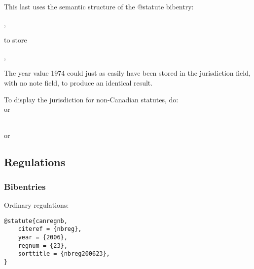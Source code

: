 \bigskip


\par\bigskip
{}\par\bigskip
{}\par\bigskip
{}\par\bigskip

This last uses the semantic structure of the @statute bibentry:\medskip

,   \medskip

to store\medskip

,  \fbox{\strut \ } \medskip

The year value 1974 could just as easily have been stored in the jurisdiction field, with no note field, to produce an identical result.\bigskip

\noindent To display the jurisdiction for non-Canadian statutes, do:\\
	{\footnotesize\textcolor{blue}{}}
	or
	{\footnotesize\textcolor{blue}{}}
   \toggletrue{statjurisdiction}

   \\
	{\footnotesize\textcolor{blue}{}}
	or
	{\footnotesize\textcolor{blue}{}}
	\togglefalse{statjurisdiction}\par\bigskip






\subsection{Regulations}
\subsubsection{Bibentries}

Ordinary regulations: \par\bigskip
\begin{verbatim}
@statute{canregnb,
	citeref = {nbreg},
	year = {2006},
	regnum = {23},
	sorttitle = {nbreg200623},
}

\end{verbatim}

